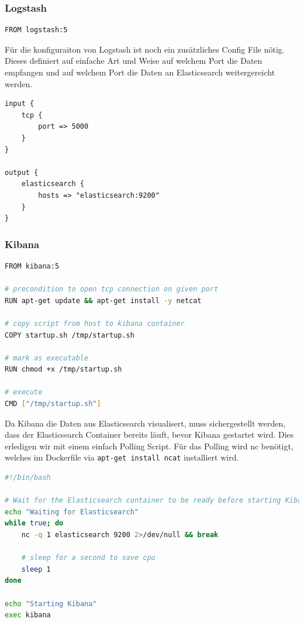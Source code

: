 \subsubsection{Logstash} 
\begin{lstlisting}[caption=Logstash Dockerfile, language=bash]
FROM logstash:5
\end{lstlisting}

Für die konfiguraiton von Logstash ist noch ein zusätzliches Config File nötig. Dieses definiert auf einfache Art und Weise auf welchem Port die Daten empfangen und auf welchem Port die Daten an Elasticsearch weitergereicht werden.
\begin{lstlisting}
input {
	tcp {
		port => 5000
	}
}

output {
	elasticsearch {
		hosts => "elasticsearch:9200"
	}
}
\end{lstlisting}

\subsubsection{Kibana} 
\begin{lstlisting}[caption=Kibana Dockerfile, language=bash]
FROM kibana:5

# precondition to open tcp connection on given port
RUN apt-get update && apt-get install -y netcat

# copy script from host to kibana container
COPY startup.sh /tmp/startup.sh

# mark as executable
RUN chmod +x /tmp/startup.sh 

# execute
CMD ["/tmp/startup.sh"] 
\end{lstlisting}

Da Kibana die Daten aus Elasticsearch visualisert, muss sichergestellt werden, dass der Elasticsearch Container bereits läuft, bevor Kibana gestartet wird. Dies erledigen wir mit einem einfach Polling Script. Für das Polling wird nc benötigt, welches im Dockerfile via \lstinline[]|apt-get install ncat| installiert wird. 
\begin{lstlisting}[caption=Kibana Pooling Script, language=bash]
#!/bin/bash

# Wait for the Elasticsearch container to be ready before starting Kibana.
echo "Waiting for Elasticsearch"
while true; do
	nc -q 1 elasticsearch 9200 2>/dev/null && break
	
	# sleep for a second to save cpu
	sleep 1
done

echo "Starting Kibana"
exec kibana
\end{lstlisting}

